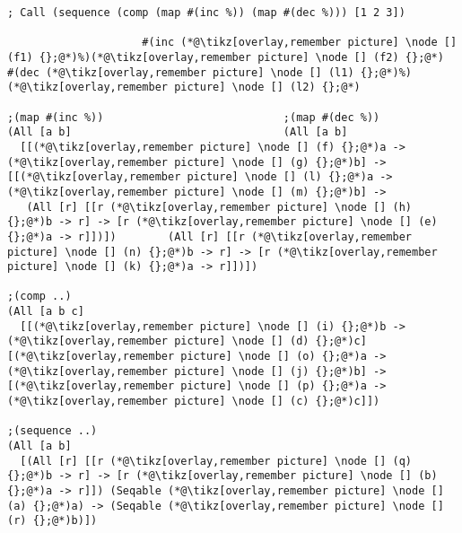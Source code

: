 \documentclass[9pt]{extarticle}
\begin{document}
\begin{lstlisting}
; Call (sequence (comp (map #(inc %)) (map #(dec %))) [1 2 3])

                     #(inc (*@\tikz[overlay,remember picture] \node [] (f1) {};@*)%)(*@\tikz[overlay,remember picture] \node [] (f2) {};@*)           #(dec (*@\tikz[overlay,remember picture] \node [] (l1) {};@*)%)(*@\tikz[overlay,remember picture] \node [] (l2) {};@*)

;(map #(inc %))                            ;(map #(dec %))
(All [a b]                                 (All [a b]
  [[(*@\tikz[overlay,remember picture] \node [] (f) {};@*)a -> (*@\tikz[overlay,remember picture] \node [] (g) {};@*)b] ->                                 [[(*@\tikz[overlay,remember picture] \node [] (l) {};@*)a -> (*@\tikz[overlay,remember picture] \node [] (m) {};@*)b] ->
   (All [r] [[r (*@\tikz[overlay,remember picture] \node [] (h) {};@*)b -> r] -> [r (*@\tikz[overlay,remember picture] \node [] (e) {};@*)a -> r]])])        (All [r] [[r (*@\tikz[overlay,remember picture] \node [] (n) {};@*)b -> r] -> [r (*@\tikz[overlay,remember picture] \node [] (k) {};@*)a -> r]])])

;(comp ..)
(All [a b c]
  [[(*@\tikz[overlay,remember picture] \node [] (i) {};@*)b -> (*@\tikz[overlay,remember picture] \node [] (d) {};@*)c] [(*@\tikz[overlay,remember picture] \node [] (o) {};@*)a -> (*@\tikz[overlay,remember picture] \node [] (j) {};@*)b] -> [(*@\tikz[overlay,remember picture] \node [] (p) {};@*)a -> (*@\tikz[overlay,remember picture] \node [] (c) {};@*)c]])

;(sequence ..)
(All [a b]
  [(All [r] [[r (*@\tikz[overlay,remember picture] \node [] (q) {};@*)b -> r] -> [r (*@\tikz[overlay,remember picture] \node [] (b) {};@*)a -> r]]) (Seqable (*@\tikz[overlay,remember picture] \node [] (a) {};@*)a) -> (Seqable (*@\tikz[overlay,remember picture] \node [] (r) {};@*)b)])
\end{lstlisting}
\end{document}
